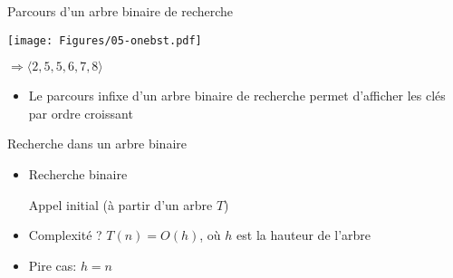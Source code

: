 \begin{frame}{Parcours d'un arbre binaire de recherche}

\begin{center}
\texttt{[image: Figures/05-onebst.pdf]}
\bigskip

$\Rightarrow \langle 2, 5, 5, 6, 7, 8\rangle$
\end{center}

\begin{itemize}
\item Le parcours infixe d'un arbre binaire de recherche permet d'afficher les clés par ordre croissant

\bigskip
\begin{center}
\begin{small}
\end{small}
\end{center}

\end{itemize}

\end{frame}

\begin{frame}{Recherche dans un arbre binaire}
\begin{itemize}
\item Recherche binaire
\begin{center}
\begin{small}

\medskip

Appel initial (à partir d'un arbre $T$)\\
\end{small}
\end{center}

\bigskip

\item Complexité ? $T(n)=O(h)$, où $h$ est la hauteur de l'arbre
\item Pire cas: $h=n$
\end{itemize}

\end{frame}

